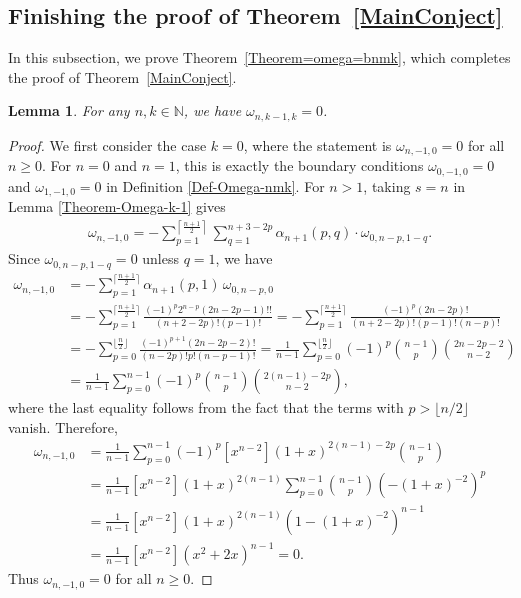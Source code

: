 \documentclass[reqno, 12pt]{article}
\newtheorem{lem}[thm]{Lemma}
\theoremstyle{mydefinition}
\theoremstyle{myremark}
\numberwithin{algorithm}{section}
\begin{document}
\subsection{Finishing the proof of Theorem~\ref{MainConject}}
\label{subsection-transform-bnkm}


In this subsection, we  prove Theorem~\ref{Theorem=omega=bnmk}, which completes the proof of Theorem~\ref{MainConject}.

\begin{lem}\label{Theorem-omega=nk-1=0}
For any $n,k\in \mathbb{N}$, we have $\omega_{n,k-1,k}=0$.
\end{lem}
\begin{proof}
We first consider the case $k=0$, where the statement is $\omega_{n,-1,0}=0$ for all $n\ge 0$. For $n=0$ and $n=1$, this is exactly the boundary conditions $\omega_{0,-1,0}=0$ and $\omega_{1,-1,0}=0$ in Definition \ref{Def-Omega-nmk}. For $n>1$, taking $s=n$ in Lemma \ref{Theorem-Omega-k-1} gives
\begin{align}\label{Equation-S=N=0-k0}
\omega_{n,-1,0}=-\sum_{p=1}^{\left\lceil \frac{n+1}{2}\right\rceil} \sum_{q=1}^{n+3-2p} \alpha_{n+1}(p,q)\cdot \omega_{0,n-p,1-q}.
\end{align}
Since $\omega_{0,n-p,1-q}=0$ unless $q=1$, we have
\begin{align*}
\omega_{n,-1,0}&=-\sum_{p=1}^{\lceil\frac{n+1}{2}\rceil}\alpha_{n+1}(p,1)\,\omega_{0,n-p,0}\\
&=-\sum_{p=1}^{\lceil\frac{n+1}{2}\rceil}\frac{(-1)^p2^{n-p}(2n-2p-1)!!}{(n+2-2p)!(p-1)!}
= -\sum_{p=1}^{\lceil\frac{n+1}{2}\rceil}\frac{(-1)^p(2n-2p)!}{(n+2-2p)!(p-1)!(n-p)!}\\
&=-\sum_{p=0}^{\lfloor\frac{n}{2}\rfloor}\frac{(-1)^{p+1}(2n-2p-2)!}{(n-2p)!p!(n-p-1)!}
= \frac{1}{n-1} \sum_{p=0}^{\lfloor\frac{n}{2}\rfloor} (-1)^p\binom{n-1}{p}\binom{2n-2p-2}{n-2}\\
&=\frac{1}{n-1} \sum_{p=0}^{n-1}(-1)^p\binom{n-1}{p}\binom{2(n-1)-2p}{n-2},
\end{align*}
where the last equality follows from the fact that the terms with $p>\lfloor n/2\rfloor$ vanish. Therefore,
\begin{align*}
\omega_{n,-1,0}&=\frac{1}{n-1} \sum_{p=0}^{n-1}(-1)^p [x^{n-2}](1+x)^{2(n-1)-2p}\binom{n-1}{p}\\
&=\frac{1}{n-1} [x^{n-2}](1+x)^{2(n-1)}\sum_{p=0}^{n-1}\binom{n-1}{p}\left(-(1+x)^{-2}\right)^p\\
&=\frac{1}{n-1} [x^{n-2}](1+x)^{2(n-1)}\left(1-(1+x)^{-2}\right)^{n-1}\\
&=\frac{1}{n-1} [x^{n-2}] (x^2+2x)^{n-1}=0.
\end{align*}
Thus $\omega_{n,-1,0}=0$ for all $n\ge 0$.


\end{proof}
\end{document}

